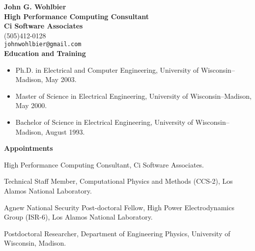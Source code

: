 \documentclass[12pt]{article}
\begin{document}
  {\noindent\bf John G. Wohlbier\\
    High Performance Computing Consultant\\
    Ci Software Associates}\\
  (505)412-0128 \\
  {\tt johnwohlbier@gmail.com}\\

{\noindent\bf Education and Training}
\begin{itemize}
\item Ph.D. in Electrical and Computer Engineering, University
  of Wisconsin--Madison, May 2003.
\item Master of Science in Electrical Engineering,
  University of Wisconsin--Madison, May 2000.
\item Bachelor of Science in Electrical Engineering,
  University of Wisconsin--Madison, August 1993.\\
\end{itemize}

{\noindent\bf Appointments}

 High Performance Computing Consultant,
Ci Software Associates.

 Technical Staff Member, Computational Physics
and Methods (CCS-2), Los Alamos National Laboratory.

 Agnew National Security Post-doctoral Fellow, High
Power Electrodynamics Group (ISR-6), Los Alamos National Laboratory.

 Postdoctoral Researcher, Department of Engineering
Physics, University of Wisconsin, Madison.\\


\end{document}
